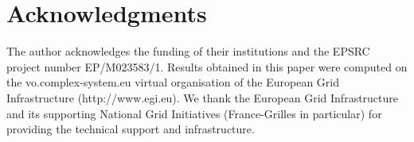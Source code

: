\documentclass[11pt]{article}
\begin{document}


\section*{Acknowledgments}

The author acknowledges the funding of their institutions and the EPSRC project number EP/M023583/1. Results obtained in this paper were computed on the vo.complex-system.eu virtual organisation of the European Grid Infrastructure (http://www.egi.eu). We thank the European Grid Infrastructure and its supporting National Grid Initiatives (France-Grilles in particular) for providing the technical support and infrastructure.
\end{document}
